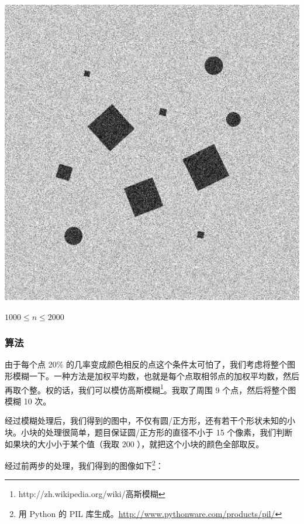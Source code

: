 \documentclass[11pt]{article}
\begin{document}
\begin{center}\includegraphics[scale = 0.2]{pic/178E3-hard-2.png} \end{center}

    $1000 \leq n \leq 2000$ 
\subsubsection{算法}
\label{sec-10-6-2}

    由于每个点 20\% 的几率变成颜色相反的点这个条件太可怕了，我们考虑将整个图形模糊一下。一种方法是加权平均数，也就是每个点取相邻点的加权平均数，然后再取个整。权的话，我们可以模仿高斯模糊\footnote{http://zh.wikipedia.org/wiki/高斯模糊
 }。我取了周围 9 个点，然后将整个图模糊 10 次。

    经过模糊处理后，我们得到的图中，不仅有圆/正方形，还有若干个形状未知的小块。小块的处理很简单，题目保证圆/正方形的直径不小于 15 个像素，我们判断如果块的大小小于某个值（我取 200 ），就把这个小块的颜色全部取反。

    经过前两步的处理，我们得到的图像如下\footnote{用 Python 的 PIL 库生成。\href{http://www.pythonware.com/products/pil/}{http://www.pythonware.com/products/pil/}
 }：
\end{document}
